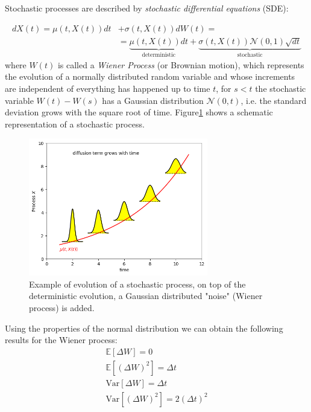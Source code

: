 \documentclass[12pt,a4paper]{book}
\begin{document}
Stochastic processes are described by \emph{stochastic differential equations} (SDE):
	
\begin{equation}
\begin{aligned}
	dX(t) = \mu(t,X(t)) dt &+ \sigma(t,X(t)) dW(t) =\\  & =\underbrace{\mu(t,X(t))dt}_{\textrm{deterministic}} + \underbrace{\sigma(t,X(t)) \mathcal{N}(0,1)\sqrt{dt}}_{\textrm{stochastic}}
\end{aligned}
\label{eq:generic_sde}
\end{equation}
where $W(t)$ is called a \emph{Wiener Process} (or Brownian motion), which represents the evolution of a normally distributed random variable and whose increments are independent of everything has happened up to time $t$, for $s< t$ the stochastic variable $W(t)-W(s)$ has a Gaussian distribution $\mathcal{N}(0, t)$, i.e. the standard deviation grows with the square root of time.
Figure\ref{fig:stochastic_process_rappr} shows a schematic representation of a stochastic process.
\begin{figure}[htpb]
\begin{center}
	\includegraphics[height=6cm]{brownian_process}
\end{center}
\caption{Example of evolution of a stochastic process, on top of the deterministic evolution, a Gaussian distributed "noise" (Wiener process) is added.}
\label{fig:stochastic_process_rappr}
\end{figure}

Using the properties of the normal distribution we can obtain the following results for the Wiener process:
\begin{equation*}
\begin{gathered}
\mathbb{E}[\Delta W] = 0 \\
\mathbb{E}[(\Delta W)^2] = \Delta t \\
\text{Var}[\Delta W] = \Delta t \\
\text{Var}[(\Delta W)^2] = 2(\Delta t)^2 \\
\end{gathered}
\end{equation*}
\end{document}
